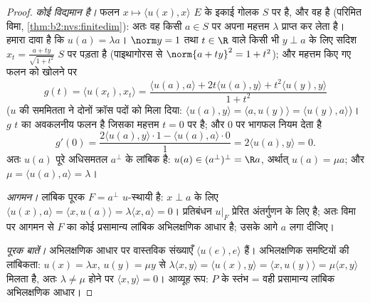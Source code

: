 \begin{proof}
\emph{कोई  विद्यमान है।} फलन $x \mapsto \langle u(x),
x\rangle$ $E$ के इकाई गोलक $S$ पर
 है, और वह  है (परिमित विमा, \cref{thm:b2:nvs:finitedim}): अतः वह किसी $a \in S$ पर अपना महत्तम
$\lambda$ प्राप्त कर लेता है। हमारा दावा है कि $u(a) = \lambda
a$। $\norm y = 1$ तथा $t \in \R$ वाले किसी भी
$y \perp a$ के लिए सदिश $x_t = \frac{a + ty}{\sqrt{1 + t^2}}$ $S$ पर पड़ता है (पाइथागोरस से $\norm{a + ty}^2 = 1 + t^2$); और महत्तम किए
गए फलन को खोलने पर
\[
g(t) = \langle u(x_t), x_t\rangle
= \frac{\langle u(a), a\rangle + 2t\langle u(a), y\rangle +
t^2\langle u(y), y\rangle}{1 + t^2}
\]
($u$ की सममितता ने दोनों क्रॉस पदों को मिला दिया: $\langle u(a),
y\rangle = \langle a, u(y)\rangle = \langle u(y), a\rangle$)। $g$ $t$ का
अवकलनीय फलन है जिसका महत्तम $t =
0$ पर है; और $0$ पर भागफल नियम देता है
\[
g'(0) = \frac{2\langle u(a), y\rangle\cdot 1 - \langle u(a),
a\rangle\cdot 0}{1} = 2\langle u(a), y\rangle = 0 .
\]
अतः $u(a)$ पूरे अधिसमतल $a^\perp$ के लांबिक है: $u(a)
\in (a^{\perp})^{\perp} = \R a$, अर्थात् $u(a) = \mu a$; और $\mu =
\langle u(a), a\rangle = \lambda$।

\emph{आगमन।} लांबिक पूरक $F = a^\perp$ $u$-स्थायी है: $x \perp a$ के लिए $\langle u(x), a\rangle = \langle x,
u(a)\rangle = \lambda\langle x, a\rangle = 0$। प्रतिबंधन $u|_F$
प्रेरित अंतर्गुणन के लिए  है; अतः विमा पर आगमन से $F$ का कोई
प्रसामान्य लांबिक अभिलक्षणिक आधार है; उसके आगे $a$ लगा दीजिए।

\emph{पूरक बातें।}  अभिलक्षणिक आधार पर वास्तविक संख्याएँ $\langle u(e),
e\rangle$
हैं। अभिलक्षणिक समष्टियों की लांबिकता: $u(x) =
\lambda x$, $u(y) = \mu y$ से $\lambda\langle x, y\rangle =
\langle u(x), y\rangle = \langle x, u(y)\rangle = \mu\langle x,
y\rangle$ मिलता है, अतः $\lambda \neq \mu$
होने पर $\langle x, y\rangle = 0$। आव्यूह रूप: $P$ के स्तंभ = वही प्रसामान्य लांबिक अभिलक्षणिक
आधार।
\end{proof}


